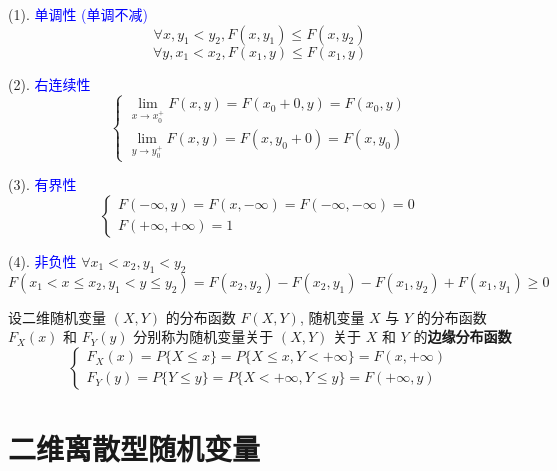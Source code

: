 \begin{corollary}[二维随机变量联合分布性质]
	(1). \textcolor{blue}{单调性 (单调不减)}
	$$\forall x, y_{1}<y_{2}, F(x,y_{1})\leq F(x,y_{2})$$
	$$\forall y, x_{1}<x_{2}, F(x_{1},y)\leq F(x_{1},y)$$
	
	(2). \textcolor{blue}{右连续性}
	$$\begin{cases}
		\lim\limits_{x\to x_{0}^{+}}F(x,y) = F(x_{0}+0,y) = F(x_{0},y)\\
		\lim\limits_{y\to y_{0}^{+}}F(x,y) = F(x,y_{0}+0) = F(x,y_{0})
	\end{cases}$$
	
	(3). \textcolor{blue}{有界性}
	$$\begin{cases}
		F(-\infty,y) = F(x,-\infty) = F(-\infty,-\infty) = 0\\ 
		F(+\infty,+\infty) = 1
	\end{cases}$$
	
	(4). \textcolor{blue}{非负性}
	$\forall x_{1} < x_{2}, y_{1}<y_{2}$
	$$F(x_{1} < x \leq x_{2}, y_{1} <y\leq y_{2}) = F(x_{2},y_{2}) - F(x_{2},y_{1}) - F(x_{1},y_{2}) + F(x_{1},y_{1})\geq 0$$
\end{corollary}

\begin{definition}[边缘分布函数]
	设二维随机变量 $(X,Y)$ 的分布函数 $F(X,Y)$, 随机变量 $X$ 与 $Y$ 的分布函数 $F_{X}(x)$ 和 $F_{Y}(y)$ 分别称为随机变量关于 $(X,Y)$ 关于 $X$ 和 $Y$ 的\textbf{边缘分布函数}
	$$\begin{cases}
		F_{X}(x) = P\{X\leq x\} = P\{X\leq x,Y<+\infty\} = F(x,+\infty)\\
		F_{Y}(y) = P\{Y\leq y\} = P\{X<+\infty,Y\leq y\} = F(+\infty,y)
	\end{cases}$$
\end{definition}

\section{二维离散型随机变量}

